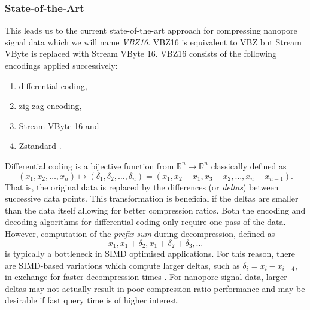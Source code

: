 

\subsubsection{State-of-the-Art}
\label{sec:state-of-the-art}

This leads us to the current state-of-the-art approach for compressing nanopore signal data which we will name \textit{VBZ16}. VBZ16 is equivalent to VBZ \cite{vbz} but Stream VByte is replaced with Stream VByte 16. VBZ16 consists of the following encodings applied successively:

\begin{enumerate}
\item differential coding,
\item zig-zag encoding,
\item Stream VByte 16 and
\item Zstandard \cite{zstd}.
\end{enumerate}

Differential coding is a bijective function from $\mathbb{R}^n\to\mathbb{R}^n$ classically defined as
\[ (x_1, x_2, \dots, x_n) \mapsto (\delta_1,\delta_2,\dots,\delta_n) = (x_1, x_2 - x_1, x_3-x_2,\dots,x_n-x_{n-1}). \]
That is, the original data is replaced by the differences (or \textit{deltas}) between successive data points.
This transformation is beneficial if the deltas are smaller than the data itself allowing for better compression ratios.
Both the encoding and decoding algorithms for differential coding only require one pass of the data.
However, computation of the \textit{prefix sum} during decompression, defined as
\[ x_1, x_1 + \delta_2, x_1 + \delta_2 + \delta_3, \dots \]
is typically a bottleneck in SIMD optimised applications.
For this reason, there are SIMD-based variations which compute larger deltas, such as $\delta_i = x_i - x_{i-4}$, in exchange for faster decompression times \cite{lemire-simd}.
For nanopore signal data, larger deltas may not actually result in poor compression ratio performance and may be desirable if fast query time is of higher interest.

